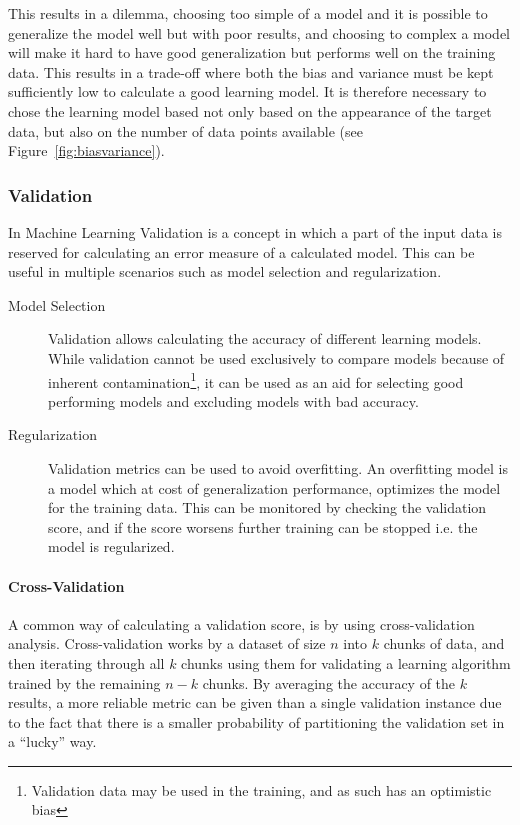 This results in a dilemma, choosing too simple of a model and it is possible to generalize the model well but with poor results, and choosing to
complex a model will make it hard to have good generalization but performs well on the training data.
This results in a trade-off where both the bias and variance must be kept sufficiently low to calculate a good learning model.
It is therefore necessary to chose the learning model based not only based on the appearance of the target data, but also on the number of data points available (see Figure~\ref{fig:biasvariance}).

\begin{minipage}{\linewidth}
\centering
{}
\label{fig:biasvariance}
\end{minipage}

\subsubsection{Validation}
\label{ssub:Validation}
In Machine Learning Validation is a concept in which a part of the input data is reserved for calculating an error measure of a calculated model.
This can be useful in multiple scenarios such as  model selection and regularization.
\begin{description}
  \item[Model Selection] Validation allows calculating the accuracy of different learning models.
    While validation cannot be used exclusively to compare models because of inherent contamination\footnote{Validation data may be used in the training, and as such has an optimistic bias\cite{learningfromdata2012book}},
    it can be used as an aid for selecting good performing models and excluding models with bad accuracy.
  \item[Regularization] Validation metrics can be used to avoid overfitting.
    An overfitting model is a model which at cost of generalization performance, optimizes the model for the training data.
    This can be monitored by checking the validation score, and if the score worsens further training can be stopped i.e. the model is regularized.
\end{description}
\paragraph{Cross-Validation}
\label{par:Cross-Validation}
A common way of calculating a validation score, is by using cross-validation analysis. Cross-validation works by a dataset of size $n$ into $k$ chunks of data, and then
iterating through all $k$ chunks using them for validating a learning algorithm trained by the remaining $n-k$ chunks. 
By averaging the accuracy of the $k$ results, a more reliable metric can be given than a single validation instance due to the fact that there is a smaller probability of
partitioning the validation set in a ``lucky'' way.

